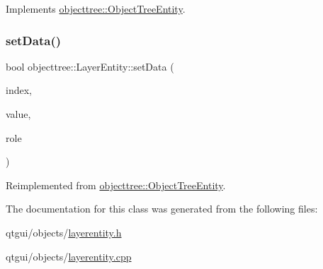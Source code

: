 Implements \mbox{\hyperlink{classobjecttree_1_1_object_tree_entity_a82c626bb28c55dcfce11cf7ec3368588}{objecttree\+::\+Object\+Tree\+Entity}}.

\mbox{\label{classobjecttree_1_1_layer_entity_ab78f47ee5a0de3e3a3ee03abcafc3097}} 
\subsubsection{\texorpdfstring{setData()}{setData()}}
{\footnotesize\ttfamily bool objecttree\+::\+Layer\+Entity\+::set\+Data (\begin{DoxyParamCaption}\item[{const Q\+Model\+Index \&}]{index,  }\item[{const Q\+Variant \&}]{value,  }\item[{int}]{role }\end{DoxyParamCaption})\hspace{0.3cm}{\ttfamily [virtual]}}



Reimplemented from \mbox{\hyperlink{classobjecttree_1_1_object_tree_entity_ab6742194e637093cb1571998bee88ff5}{objecttree\+::\+Object\+Tree\+Entity}}.



The documentation for this class was generated from the following files\+:\begin{DoxyCompactItemize}
\item 
qtgui/objects/\mbox{\hyperlink{layerentity_8h}{layerentity.\+h}}\item 
qtgui/objects/\mbox{\hyperlink{layerentity_8cpp}{layerentity.\+cpp}}\end{DoxyCompactItemize}

